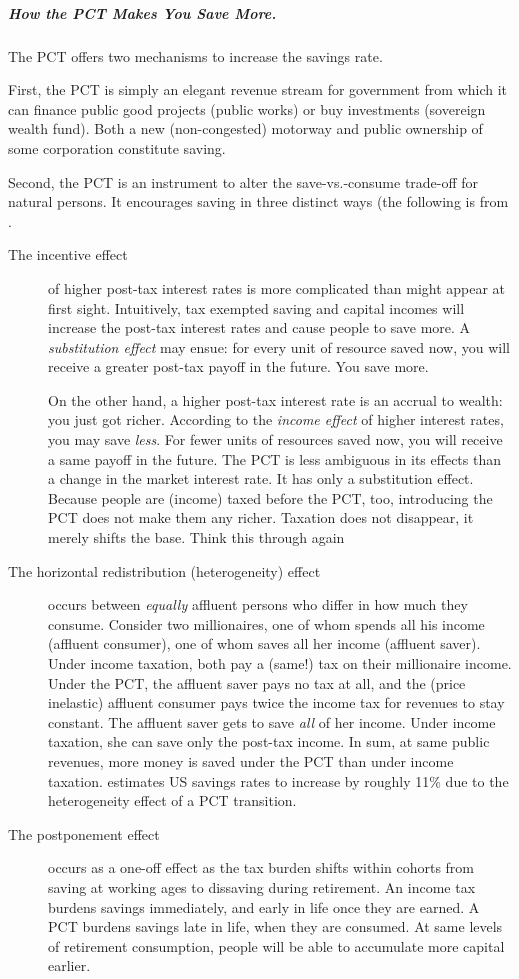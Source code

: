 \subparagraph{How the PCT Makes You Save More.}
The PCT offers two mechanisms to increase the savings rate.

First, the PCT is simply an elegant revenue stream for government from which it can finance public good projects (public works) or buy investments (sovereign wealth fund).
Both a new (non-congested) motorway and public ownership of some corporation constitute saving.

Second, the PCT is an instrument to alter the save-vs.-consume trade-off for natural persons.
It encourages saving in three distinct ways (the following is from \citep[28ff]{Seidman1997}.
\begin{description}
	\item[The incentive effect]
	of higher post-tax interest rates is more complicated than might appear at first sight.
	Intuitively, tax exempted saving and capital incomes will increase the post-tax interest rates and cause people to save more.
	A \emph{substitution effect} may ensue:
	for every unit of resource saved now, you will receive a greater post-tax payoff in the future.
	You save more.

	On the other hand, a higher post-tax interest rate is an accrual to wealth:
	you just got richer.
	According to the \emph{income effect} of higher interest rates, you may save \emph{less}.
	For fewer units of resources saved now, you will receive a same payoff in the future.
	The PCT is less ambiguous in its effects than a change in the market interest rate.
	It has only a substitution effect.
	Because people are (income) taxed before the PCT, too, introducing the PCT does not make them any richer.
	Taxation does not disappear, it merely shifts the base.
	Think this through again
	\item[The horizontal redistribution (heterogeneity) effect]
	occurs between \emph{equally} affluent persons who differ in how much they consume.
	Consider two millionaires, one of whom spends all his income (affluent consumer), one of whom saves all her income (affluent saver).
	Under income taxation, both pay a (same!) tax on their millionaire income.
	Under the PCT, the affluent saver pays no tax at all, and the (price inelastic) affluent consumer pays twice the income tax for revenues to stay constant.
	The affluent saver gets to save \emph{all} of her income.
	Under income taxation, she can save only the post-tax income.
	In sum, at same public revenues, more money is saved under the PCT than under income taxation.
	\citeauthor{Seidman1997} estimates US savings rates to increase by roughly 11\% due to the heterogeneity effect of a PCT transition.
	\item[The postponement effect]
	occurs as a one-off effect as the tax burden shifts within cohorts from saving at working ages to dissaving during retirement.
	An income tax burdens savings immediately, and early in life once they are earned.
	A PCT burdens savings late in life, when they are consumed.
	At same levels of retirement consumption, people will be able to accumulate more capital earlier.


\end{description}
